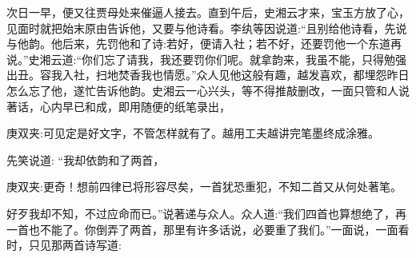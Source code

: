 \begin{parag}
    次日一早，便又往贾母处来催逼人接去。直到午后，史湘云才来，宝玉方放了心，见面时就把始末原由告诉他，又要与他诗看。李纨等因说道:“且别给他诗看，先说与他韵。他后来，先罚他和了诗:若好，便请入社；若不好，还要罚他一个东道再说。”史湘云道:“你们忘了请我，我还要罚你们呢。就拿韵来，我虽不能，只得勉强出丑。容我入社，扫地焚香我也情愿。”众人见他这般有趣，越发喜欢，都埋怨昨日怎么忘了他，遂忙告诉他韵。史湘云一心兴头，等不得推敲删改，一面只管和人说著话，心内早已和成，即用随便的纸笔录出，\begin{note}庚双夹:可见定是好文字，不管怎样就有了。越用工夫越讲完笔墨终成涂雅。\end{note}先笑说道: “我却依韵和了两首，\begin{note}庚双夹:更奇！想前四律已将形容尽矣，一首犹恐重犯，不知二首又从何处著笔。\end{note}好歹我却不知，不过应命而已。”说著递与众人。众人道:“我们四首也算想绝了，再一首也不能了。你倒弄了两首，那里有许多话说，必要重了我们。”一面说，一面看时，只见那两首诗写道:
\end{parag}



